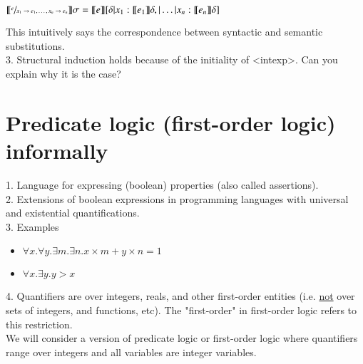 \documentclass{article}[12pt]
\begin{document}
\begin{corollary}
    $\llbracket \sfrac{e}{x_1 \rightarrow e_1, \ldots, x_n \rightarrow e_n} \rrbracket \sigma = \llbracket e \rrbracket [\delta | x_1 : \llbracket e_1 \rrbracket \delta, | \ldots | x_n : \llbracket e_n \rrbracket \delta]$
\end{corollary}
This intuitively says the correspondence between syntactic and semantic substitutions. \\
3. Structural induction holds because of the initiality of <intexp>. Can you explain why it is the case?
\section{Predicate logic (first-order logic) informally}
1. Language for expressing (boolean) properties (also called assertions). \\
2. Extensions of boolean expressions in programming languages with universal and existential quantifications. \\
3. Examples
\begin{itemize}
    \item $\forall x. \forall y. \exists m. \exists n. x \times m + y \times n = 1$
    \item $\forall x. \exists y. y > x$
\end{itemize}
4. Quantifiers are over integers, reals, and other first-order entities (i.e. \underline{not} over sets of integers, and functions, etc). The "first-order" in first-order logic refers to this restriction. \\
We will consider a version of predicate logic or first-order logic where quantifiers range over integers and all variables are integer variables.
\end{document}
